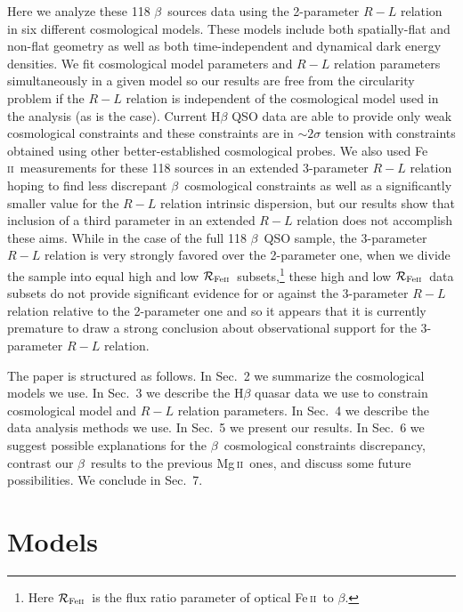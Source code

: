 \documentclass[a4paper,fleqn,usenatbib]{mnras}
\newcommand{\rfe}{${\cal R}_{\rm{Fe\textsc{ii}}}$}
\newcommand{\Feii}{Fe\,\textsc{ii}}
\newcommand{\Mgii}{Mg\,\textsc{ii}}
\newcommand{\hb}{{\sc{H}}$\beta$\/}
\begin{document}
Here we analyze these 118 \hb\ sources data using the 2-parameter $R-L$ relation in six different cosmological models. These models include both spatially-flat and non-flat geometry as well as both time-independent and dynamical dark energy densities. We fit cosmological model parameters and $R-L$ relation parameters simultaneously in a given model so our results are free from the circularity problem if the $R-L$ relation is independent of the cosmological model used in the analysis (as is the case). Current H$\beta$ QSO data are able to provide only weak cosmological constraints and these constraints are in $\sim 2\sigma$ tension with constraints obtained using other better-established cosmological probes. We also used \Feii\ measurements for these 118 sources in an extended 3-parameter $R-L$ relation hoping to find less discrepant \hb\ cosmological constraints as well as a significantly smaller value for the $R-L$ relation intrinsic dispersion, but our results show that inclusion of a third parameter in an extended $R-L$ relation does not accomplish these aims. While in the case of the full 118 \hb\ QSO sample, the 3-parameter $R-L$ relation is very strongly favored over the 2-parameter one, when we divide the sample into equal high and low \rfe\ subsets,\footnote{Here \rfe\ is the flux ratio parameter of optical \Feii\ to \hb.} these high and low \rfe\ data subsets do not provide significant evidence for or against the 3-parameter $R-L$ relation relative to the 2-parameter one and so it appears that it is currently premature to draw a strong conclusion about observational support for the 3-parameter $R-L$ relation.

The paper is structured as follows. In Sec.~2 we summarize the cosmological models we use. In Sec.~3 we describe the H$\beta$ quasar data we use to constrain cosmological model and $R-L$ relation parameters. In Sec.~4 we describe the data analysis methods we use. In Sec.~5 we present our results. In Sec.~6 we suggest possible explanations for the \hb\ cosmological constraints discrepancy, contrast our \hb\ results to the previous \Mgii\ ones, and discuss some future possibilities. We conclude in Sec.~7.

\section{Models}
\label{sec:models}
\end{document}
